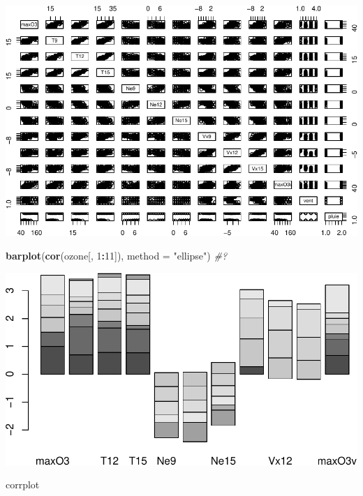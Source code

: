 \documentclass[
]{article}
\newenvironment{Shaded}{\begin{snugshade}}{\end{snugshade}}
\newcommand{\AttributeTok}[1]{\textcolor[rgb]{0.13,0.29,0.53}{#1}}
\newcommand{\CommentTok}[1]{\textcolor[rgb]{0.56,0.35,0.01}{\textit{#1}}}
\newcommand{\DecValTok}[1]{\textcolor[rgb]{0.00,0.00,0.81}{#1}}
\newcommand{\FunctionTok}[1]{\textcolor[rgb]{0.13,0.29,0.53}{\textbf{#1}}}
\newcommand{\NormalTok}[1]{#1}
\newcommand{\SpecialCharTok}[1]{\textcolor[rgb]{0.81,0.36,0.00}{\textbf{#1}}}
\newcommand{\StringTok}[1]{\textcolor[rgb]{0.31,0.60,0.02}{#1}}
\begin{document}
\includegraphics{TP-ML-Regression_files/figure-latex/unnamed-chunk-4-2.pdf}

\begin{Shaded}
\begin{Highlighting}[]
\FunctionTok{barplot}\NormalTok{(}\FunctionTok{cor}\NormalTok{(ozone[, }\DecValTok{1}\SpecialCharTok{:}\DecValTok{11}\NormalTok{]), }\AttributeTok{method =} \StringTok{"ellipse"}\NormalTok{)    }\CommentTok{\#?}
\end{Highlighting}
\end{Shaded}

\includegraphics{TP-ML-Regression_files/figure-latex/unnamed-chunk-4-3.pdf}

\begin{Shaded}
\begin{Highlighting}[]
\NormalTok{corrplot}
\end{Highlighting}
\end{Shaded}
\end{document}
